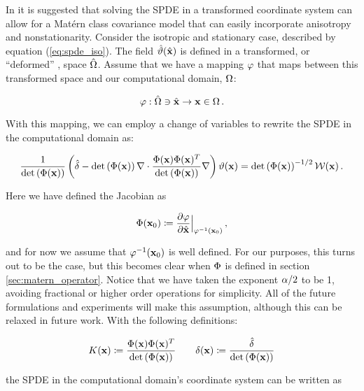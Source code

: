 In \citet{RSSB:RSSB777} it is suggested that solving the SPDE in a transformed
coordinate system can allow for a Mat\'ern class covariance
model that can easily incorporate anisotropy and nonstationarity.
Consider the isotropic and stationary case, described by equation
(\ref{eq:spde_iso}).
The field $\hat{\vartheta}(\hat{\mathbf{x}})$ is defined in a transformed, or ``deformed''
\citep{sampson_nonparametric_1992}, space $\hat{\Omega}$.
Assume that we have a mapping $\varphi$ that maps between this transformed space
and our computational domain, $\Omega$:
\begin{linenomath*}\begin{equation*}
    \varphi : \hat{\Omega}\ni\hat{\mathbf{x}} \rightarrow \mathbf{x}\in\Omega \, .
\end{equation*}\end{linenomath*}
With this mapping, we can employ a change of variables
\citep{smith_change_1934} to rewrite the SPDE in the computational domain as:
\begin{linenomath*}\begin{equation*}
    \dfrac{1}{\text{det}\left(\Phi(\mathbf{x})\right)}
    \left(\hat{\delta} -
    \text{det}\left(\Phi(\mathbf{x})\right)\nabla\cdot
    \dfrac{\Phi(\mathbf{x})\Phi(\mathbf{x})^T}{\text{det}\left(\Phi(\mathbf{x})\right)}
    \nabla\right)\vartheta(\mathbf{x}) =
    \text{det}\left(\Phi(\mathbf{x})\right)^{-1/2}\mathcal{W}(\mathbf{x}) \, .
\end{equation*}\end{linenomath*}
Here we have defined the Jacobian as
\begin{linenomath*}\begin{equation*}
    \Phi(\mathbf{x}_0) \coloneqq
    \dfrac{\partial \varphi}{\partial \hat{\mathbf{x}}}\Big|_{\varphi^{-1}(\mathbf{x}_{0})} \, ,
\end{equation*}\end{linenomath*}
and for now we assume that $\varphi^{-1}(\mathbf{x}_0)$ is well defined.
For our purposes, this turns out to be the case, but this becomes clear when
$\Phi$ is defined in section \ref{sec:matern_operator}.
Notice that we have taken the exponent $\alpha/2$ to be 1, avoiding
fractional or higher order operations for simplicity.
All of the future formulations and experiments will make this assumption,
although this can be relaxed in future work.
With the following definitions:
\begin{linenomath*}\begin{equation}
    K(\mathbf{x}) \coloneqq
    \dfrac{\Phi(\mathbf{x})\Phi(\mathbf{x})^T}{\text{det}\left(\Phi(\mathbf{x})\right)}
    \qquad
    \delta(\mathbf{x}) \coloneqq \dfrac{\hat{\delta}}{\text{det}\left(\Phi(\mathbf{x})\right)}
    \label{eq:matern_definitions}
\end{equation}\end{linenomath*}
the SPDE in the computational domain's coordinate system can be written as
